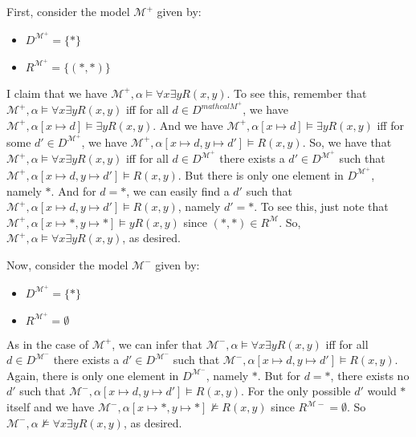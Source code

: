 \begin{itemize}
                    First, consider the model $\mathcal{M}^+$ given by:
                    \begin{itemize}
                    \item $D^{\mathcal{M}^+}=\{\ast\}$
                    \item $R^{\mathcal{M}^+}=\{(\ast,\ast)\}$
                    \end{itemize}
                    I claim that we have $\mathcal{M}^+,\alpha\vDash
                    \forall x\exists yR(x,y)$. To see this, remember
                    that $\mathcal{M}^+,\alpha\vDash
                    \forall x\exists yR(x,y)$ iff for all
                    $d\in D^{mathcal{M}^+}$, we have
                    $\mathcal{M}^+,\alpha[x\mapsto d]\vDash
                    \exists yR(x,y)$. And we have $\mathcal{M}^+,\alpha[x\mapsto d]\vDash
                    \exists yR(x,y)$ iff for some $d'\in
                    D^{\mathcal{M}^+}$, we have
                    $\mathcal{M}^+,\alpha[x\mapsto d, y\mapsto d']\vDash
                    R(x,y)$. So, we have that $\mathcal{M}^+,\alpha\vDash
                    \forall x\exists yR(x,y)$ iff for all $d\in
                    D^{\mathcal{M}^+}$ there exists a $d'\in
                    D^{\mathcal{M}^+}$ such that  $\mathcal{M}^+,\alpha[x\mapsto d, y\mapsto d']\vDash
                    R(x,y)$. But there is only one element in
                    $D^{\mathcal{M}^+}$, namely $\ast$. And for
                    $d=\ast$, we can easily find a $d'$ such that $\mathcal{M}^+,\alpha[x\mapsto d, y\mapsto d']\vDash
                    R(x,y)$, namely $d'=\ast$. To see this, just note
                    that $\mathcal{M}^+,\alpha[x\mapsto \ast, y\mapsto \ast]\vDash
                    yR(x,y)$ since
                    $(\ast, \ast)\in R^\mathcal{M}$. So, $\mathcal{M}^+,\alpha\vDash
                    \forall x\exists yR(x,y)$, as desired.

                    Now, consider the model $\mathcal{M}^-$ given by:
                    \begin{itemize}
                    \item $D^{\mathcal{M}^+}=\{\ast\}$
                    \item $R^{\mathcal{M}^+}=\emptyset$
                    \end{itemize}
                   As in the case of $\mathcal{M}^+$, we can infer
                   that $\mathcal{M}^-,\alpha\vDash
                    \forall x\exists yR(x,y)$ iff for all $d\in
                    D^{\mathcal{M}^-}$ there exists a $d'\in
                    D^{\mathcal{M}^-}$ such that  $\mathcal{M}^-,\alpha[x\mapsto d, y\mapsto d']\vDash
                    R(x,y)$. Again, there is only one element in
                    $D^{\mathcal{M}^-}$, namely $\ast$. But for
                    $d=\ast$, there exists no $d'$ such that $\mathcal{M}^-,\alpha[x\mapsto d, y\mapsto d']\vDash
                    R(x,y)$. For the only possible $d'$ would $\ast$
                    itself and we have $\mathcal{M}^-,\alpha[x\mapsto \ast, y\mapsto \ast]\nvDash
                    R(x,y)$ since $R^{\mathcal{M}-}=\emptyset$. So  $\mathcal{M}^-,\alpha\nvDash
                    \forall x\exists yR(x,y)$, as desired.
                    

\end{itemize}
